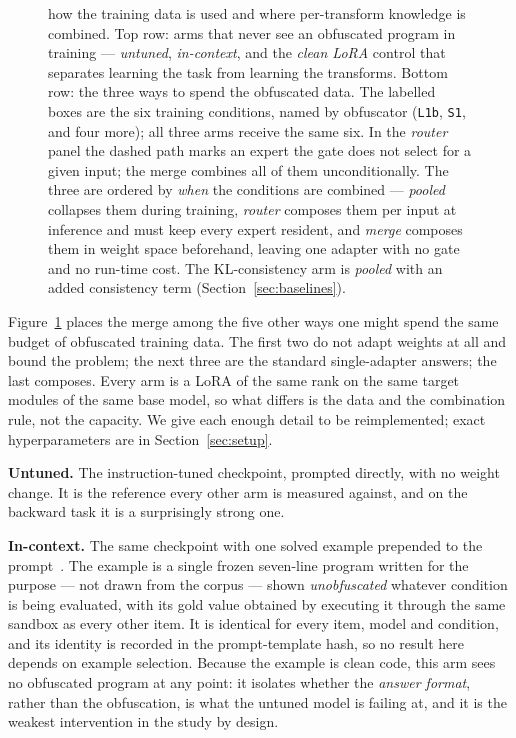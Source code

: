 \begin{figure}[t]
{how the training data is used and where per-transform knowledge is combined. Top row: arms that never
see an obfuscated program in training --- \emph{untuned}, \emph{in-context}, and the \emph{clean
LoRA} control that separates learning the task from learning the transforms. Bottom row: the three ways to spend the obfuscated data. The labelled boxes are the six training
conditions, named by obfuscator (\texttt{L1b}, \texttt{S1}, and four more); all three arms receive
the same six. In the \emph{router} panel the dashed path marks an expert the gate does not select for a given input; the merge combines all of them unconditionally. The three are ordered by \emph{when} the conditions are combined ---
\emph{pooled} collapses them during training, \emph{router} composes them per input at inference and
must keep every expert resident, and \emph{merge} composes them in weight space beforehand, leaving
one adapter with no gate and no run-time cost. The KL-consistency arm is \emph{pooled} with an added
consistency term (Section~\ref{sec:baselines}).}
\label{fig:baselines}
\end{figure}

Figure~\ref{fig:baselines} places the merge among the five other ways one might spend the same budget
of obfuscated training data. The first two do not adapt weights at all and bound the problem; the next
three are the standard single-adapter answers; the last composes. Every arm is a LoRA of the same rank
on the same target modules of the same base model, so what differs is the data and the combination
rule, not the capacity. We give each enough detail to be reimplemented; exact hyperparameters are in
Section~\ref{sec:setup}.

\noindent\textbf{Untuned.} The instruction-tuned checkpoint, prompted directly, with no weight change.
It is the reference every other arm is measured against, and on the backward task it is a surprisingly
strong one.

\noindent\textbf{In-context.} The same checkpoint with one solved example prepended to the
prompt~\cite{fewshot}. The example is a single frozen seven-line program written for the purpose ---
not drawn from the corpus --- shown \emph{unobfuscated} whatever condition is being evaluated, with
its gold value obtained by executing it through the same sandbox as every other item. It is identical
for every item, model and condition, and its identity is recorded in the prompt-template hash, so no
result here depends on example selection. Because the example is clean code, this arm sees no
obfuscated program at any point: it isolates whether the \emph{answer format}, rather than the
obfuscation, is what the untuned model is failing at, and it is the weakest intervention in the study
by design.

